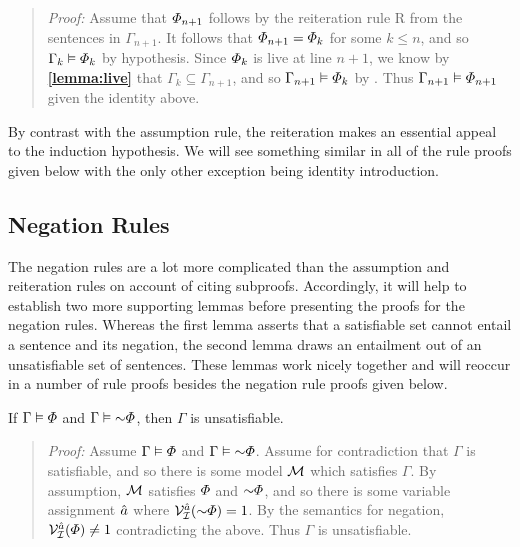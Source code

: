 \begin{quote} 
  \textit{Proof:} Assume that $\varPhi_{n+1}$ follows by the reiteration rule R from the sentences in $\Gamma_{n+1}$.
  It follows that $\varPhi_{n+1}=\varPhi_{k}$ for some $k\leq n$, and so $\Gamma_k \vDash \varPhi_k$ by hypothesis.
  Since $\varPhi_k$ is live at line $n+1$, we know by \textbf{\ref{lemma:live}} that $\Gamma_k\subseteq \Gamma_{n+1}$, and so $\Gamma_{n+1} \vDash \varPhi_{k}$ by .
  Thus $\Gamma_{n+1} \vDash \varPhi_{n+1}$ given the identity above.
\end{quote}

By contrast with the assumption rule, the reiteration makes an essential appeal to the induction hypothesis.
We will see something similar in all of the rule proofs given below with the only other exception being identity introduction.



\subsection{Negation Rules}%
  \label{sub:NegationRules}

The negation rules are a lot more complicated than the assumption and reiteration rules on account of citing subproofs.
Accordingly, it will help to establish two more supporting lemmas before presenting the proofs for the negation rules.
Whereas the first lemma asserts that a satisfiable set cannot entail a sentence and its negation, the second lemma draws an entailment out of an unsatisfiable set of sentences.
These lemmas work nicely together and will reoccur in a number of rule proofs besides the negation rule proofs given below.
  
\begin{Lthm} \label{lemma:unsat}
  If $\Gamma \vDash \varPhi$ and $\Gamma \models \enot\metaA$, then $\Gamma$ is unsatisfiable.
\end{Lthm}

\begin{quote} 
  \textit{Proof:} Assume $\Gamma \vDash \varPhi$ and $\Gamma \models \enot\metaA$.
  Assume for contradiction that $\Gamma$ is satisfiable, and so there is some model $\mathcal{M}$ which satisfies $\Gamma$. 
  By assumption, $\mathcal{M}$ satisfies $\varPhi$ and $\enot\metaA$, and so there is some variable assignment $\hat{a}$ where $\VV{\I}{\va{a}}(\enot\metaA)=1$.
  By the semantics for negation, $\mathcal{V}_{\mathcal{I}}^{\hat{a}}(\varPhi)\neq 1$ contradicting the above.
  Thus $\Gamma$ is unsatisfiable. 
\end{quote}




